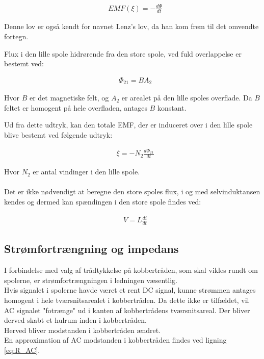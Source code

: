 \begin{align}
	&EMF(\xi) = - \frac{d\Phi}{dt}
\end{align}

Denne lov er også kendt for navnet Lenz's lov, da han kom frem til det omvendte fortegn.

Flux i den lille spole hidrørende fra den store spole, ved fuld overlappelse er bestemt ved:

\begin{align}
	&\Phi_{21} = BA_2
\end{align}

Hvor $B$ er det magnetiske felt, og $A_2$ er arealet på den lille spoles overflade.
Da $B$ feltet er homogent på hele overfladen, antages $B$ konstant. 

Ud fra dette udtryk, kan den totale EMF, der er induceret over i den lille spole blive bestemt ved følgende udtryk:

\begin{align}
	&\xi = -N_2\frac{d\Phi_{21}}{dt} \label{eq:emf_lille_spole}
\end{align}

Hvor $N_2$ er antal vindinger i den lille spole.
\\ \\
Det er ikke nødvendigt at beregne den store spoles flux, i og med selvinduktansen kendes og dermed kan spændingen i den store spole findes ved:

\begin{align}
	&V = L\frac{di}{dt} \label{eq:ldidt}
\end{align}

\subsection{Strømfortrængning  og impedans}\label{Sec_skineff.}
I forbindelse med valg af trådtykkelse på kobbertråden, som skal vikles rundt om spolerne, er strømfortrængningen i ledningen væsentlig.\\
Hvis signalet i spolerne havde været et rent DC signal, kunne strømmen antages homogent i hele tværsnitsarealet i kobbertråden.
Da dette ikke er tilfældet, vil AC signalet "fotrænge" ud i kanten af kobbertrådens tværsnitsareal. 
Der bliver derved skabt et hulrum inden i kobbertråden. \\
Herved bliver modstanden i kobbertråden ændret.\\
En approximation af AC modstanden i kobbertråden findes ved ligning \ref{eq:R_AC}.

